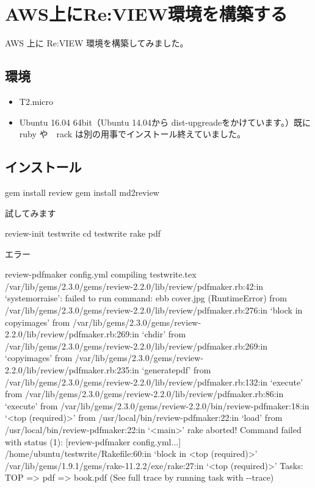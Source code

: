 \chapter{AWS上にRe:VIEW環境を構築する}
\label{chap:AWSReVIEW}

AWS 上に Re:VIEW 環境を構築してみました。

\section{環境}
\label{sec:3-1}

\begin{itemize}
\item T2.micro
\item Ubuntu 16.04 64bit（Ubuntu 14.04から dist{-}upgreadeをかけています。）既に ruby や　rack は別の用事でインストール終えていました。
\end{itemize}

\section{インストール}
\label{sec:3-2}

\begin{reviewemlist}
gem install review
gem install md2review
\end{reviewemlist}

試してみます

\begin{reviewemlist}
review{-}init testwrite
cd testwrite
rake pdf
\end{reviewemlist}

エラー

\begin{reviewemlist}
review{-}pdfmaker config.yml
compiling testwrite.tex
/var/lib/gems/2.3.0/gems/review{-}2.2.0/lib/review/pdfmaker.rb:42:in `system\textunderscore{}or\textunderscore{}raise': failed to run command: ebb cover.jpg (RuntimeError)
    from /var/lib/gems/2.3.0/gems/review{-}2.2.0/lib/review/pdfmaker.rb:276:in `block in copy\textunderscore{}images'
    from /var/lib/gems/2.3.0/gems/review{-}2.2.0/lib/review/pdfmaker.rb:269:in `chdir'
    from /var/lib/gems/2.3.0/gems/review{-}2.2.0/lib/review/pdfmaker.rb:269:in `copy\textunderscore{}images'
    from /var/lib/gems/2.3.0/gems/review{-}2.2.0/lib/review/pdfmaker.rb:235:in `generate\textunderscore{}pdf'
    from /var/lib/gems/2.3.0/gems/review{-}2.2.0/lib/review/pdfmaker.rb:132:in `execute'
    from /var/lib/gems/2.3.0/gems/review{-}2.2.0/lib/review/pdfmaker.rb:86:in `execute'
    from /var/lib/gems/2.3.0/gems/review{-}2.2.0/bin/review{-}pdfmaker:18:in `\textless{}top (required)\textgreater{}'
    from /usr/local/bin/review{-}pdfmaker:22:in `load'
    from /usr/local/bin/review{-}pdfmaker:22:in `\textless{}main\textgreater{}'
rake aborted!
Command failed with status (1): [review{-}pdfmaker config.yml...]
/home/ubuntu/testwrite/Rakefile:60:in `block in \textless{}top (required)\textgreater{}'
/var/lib/gems/1.9.1/gems/rake{-}11.2.2/exe/rake:27:in `\textless{}top (required)\textgreater{}'
Tasks: TOP =\textgreater{} pdf =\textgreater{} book.pdf
(See full trace by running task with {-}{-}trace)
\end{reviewemlist}

